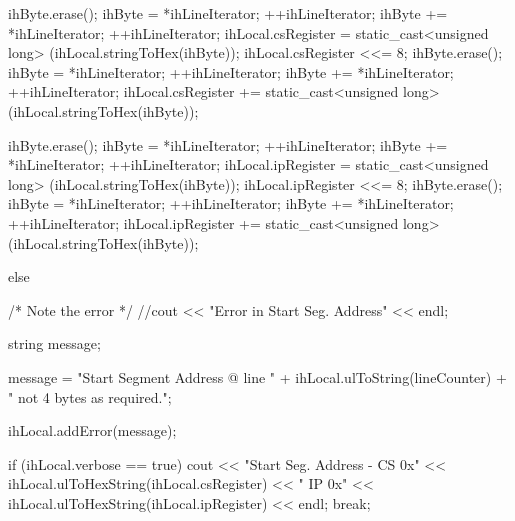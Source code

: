 \begin{DoxyCode}
{{{{{{                            ihByte.erase();
                            ihByte = *ihLineIterator;
                            ++ihLineIterator;
                            ihByte += *ihLineIterator;
                            ++ihLineIterator;
                            ihLocal.csRegister = static_cast<unsigned long>
                                                  (ihLocal.stringToHex(ihByte));
                            ihLocal.csRegister <<= 8;
                            ihByte.erase();
                            ihByte = *ihLineIterator;
                            ++ihLineIterator;
                            ihByte += *ihLineIterator;
                            ++ihLineIterator;
                            ihLocal.csRegister += static_cast<unsigned long>
                                                  (ihLocal.stringToHex(ihByte));
                                
                            ihByte.erase();
                            ihByte = *ihLineIterator;
                            ++ihLineIterator;
                            ihByte += *ihLineIterator;
                            ++ihLineIterator;
                            ihLocal.ipRegister = static_cast<unsigned long>
                                                  (ihLocal.stringToHex(ihByte));
                            ihLocal.ipRegister <<= 8;
                            ihByte.erase();
                            ihByte = *ihLineIterator;
                            ++ihLineIterator;
                            ihByte += *ihLineIterator;
                            ++ihLineIterator;
                            ihLocal.ipRegister += static_cast<unsigned long>
                                                  (ihLocal.stringToHex(ihByte));
                        }
                        else
                        {
                            /* Note the error                                 */
                            //cout << "Error in Start Seg. Address" << endl;
                            
                            string message;
                            
                            message = "Start Segment Address @ line " +
                                      ihLocal.ulToString(lineCounter) + 
                                      " not 4 bytes as required.";
                            
                            ihLocal.addError(message);
                        }
                        if (ihLocal.verbose == true)
                        {
                            cout << "Start Seg. Address - CS 0x" <<
                                 ihLocal.ulToHexString(ihLocal.csRegister) <<
                                 " IP 0x" << 
                                 ihLocal.ulToHexString(ihLocal.ipRegister) 
                                                                        << endl;
                        }
                        break;
                        
}}}}}
\end{DoxyCode}
